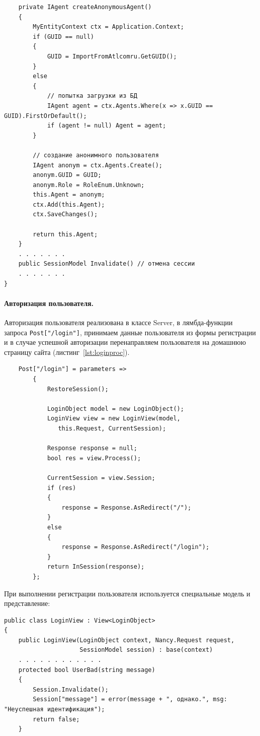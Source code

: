 \documentclass[a4paper,14pt,openany,final]{extreport} %
\def\oldcaption{} \let\oldcaption=\caption
\def\caption{\stepcounter{captionsnum}\oldcaption}
\begin{document}
{\begin{verbatim}
    private IAgent createAnonymousAgent()
    {
        MyEntityContext ctx = Application.Context;
        if (GUID == null)
        {
            GUID = ImportFromAtlcomru.GetGUID();
        }
        else
        {
            // попытка загрузки из БД
            IAgent agent = ctx.Agents.Where(x => x.GUID == GUID).FirstOrDefault();
            if (agent != null) Agent = agent;
        }

        // создание анонимного пользователя
        IAgent anonym = ctx.Agents.Create();
        anonym.GUID = GUID;
        anonym.Role = RoleEnum.Unknown;
        this.Agent = anonym;
        ctx.Add(this.Agent);
        ctx.SaveChanges();

        return this.Agent;
    }
    . . . . . . .
    public SessionModel Invalidate() // отмена сессии
    . . . . . . .
}
\end{verbatim}



\paragraph{Авторизация пользователя.}
Авторизация пользователя реализована в классе Server, в лямбда-функции запроса \verb|Post["/login"]|, принимаем данные пользователя из формы регистрации и в случае успешной авторизации перенаправляем пользователя на домашнюю страницу сайта (листинг~\ref{lst:loginproc}).

\begin{pzlisting}
\caption{Авторизация пользователя на сайте}\label{lst:loginproc}
\begin{verbatim}
    Post["/login"] = parameters =>
        {
            RestoreSession();

            LoginObject model = new LoginObject();
            LoginView view = new LoginView(model,
               this.Request, CurrentSession);

            Response response = null;
            bool res = view.Process();

            CurrentSession = view.Session;
            if (res)
            {
                response = Response.AsRedirect("/");
            }
            else
            {
                response = Response.AsRedirect("/login");
            }
            return InSession(response);
        };
\end{verbatim}
\end{pzlisting}

При выполнении регистрации пользователя используется специальные модель и представление:
\begin{verbatim}
public class LoginView : View<LoginObject>
{
    public LoginView(LoginObject context, Nancy.Request request,
                     SessionModel session) : base(context)
    . . . . . . . . . . . .
    protected bool UserBad(string message)
    {
        Session.Invalidate();
        Session["message"] = error(message + ", однако.", msg: "Неуспешная идентификация");
        return false;
    }


\end{verbatim}}
\end{document}
